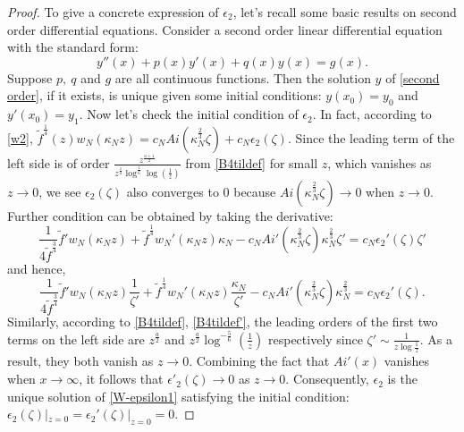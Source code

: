 \documentclass[11pt]{article}
\numberwithin{equation}{section}%
\numberwithin{theorem}{section}
\begin{document}
\begin{proof}
    To give a concrete expression of $\epsilon_2$, let's recall some basic results on second order differential equations. Consider a second order linear differential equation with the standard form:
    \begin{equation}\label{second order}
        y''(x)+p(x)y'(x)+q(x)y(x)=g(x).
    \end{equation}
    Suppose $p,~q$ and $g$ are all continuous functions. Then the solution $y$ of \eqref{second order}, if it exists, is unique given some initial conditions: $y(x_0)=y_0$ and $y'(x_0)=y_1$. Now let's check the initial condition of $\epsilon_2$. In fact, according to \eqref{w2}, $\tilde{f}^\frac{1}{4}(z)w_N(\kappa_Nz)=c_NAi\left(\kappa_N^\frac{2}{3}\zeta\right)+c_N\epsilon_2(\zeta)$. Since the leading term of the left side is of order $\frac{z^\frac{a+1}{2}}{z^\frac{1}{2}\log^\frac{1}{6}\log\left(\frac{1}{z}\right)}$ from \eqref{B4tildef} for small $z$, which vanishes as $z\rightarrow0$, we see $\epsilon_2(\zeta)$ also converges to $0$ because $Ai\left(\kappa_N^\frac{2}{3}\zeta\right)\rightarrow0$ when $z\rightarrow0$. Further condition can be obtained by taking the derivative:
    \begin{equation*}
        \frac{1}{4\tilde{f}^\frac{3}{4}}\tilde{f}'w_N(\kappa_Nz)+\tilde{f}^\frac{1}{4}w_N'(\kappa_Nz)\kappa_N-c_NAi'\left(\kappa_N^\frac{2}{3}\zeta\right)\kappa_N^\frac{2}{3}\zeta'=c_N\epsilon_2'(\zeta)\zeta'
    \end{equation*}
    and hence,
        \begin{equation*}
        \frac{1}{4\tilde{f}^\frac{3}{4}}\tilde{f}'w_N(\kappa_Nz)\frac{1}{\zeta'}+\tilde{f}^\frac{1}{4}w_N'(\kappa_Nz)\frac{\kappa_N}{\zeta'}-c_NAi'\left(\kappa_N^\frac{2}{3}\zeta\right)\kappa_N^\frac{2}{3}=c_N\epsilon_2'(\zeta).
    \end{equation*}
    Similarly, according to \eqref{B4tildef}, \eqref{B4tildef'}, the leading orders of the first two terms on the left side are $z^\frac{a}{2}$ and $z^\frac{a}{2}\log^{-\frac{5}{6}}\left(\frac{1}{z}\right)$ respectively since $\zeta'\sim\frac{1}{z\log\frac{1}{z}}$. As a result, they both vanish as $z\rightarrow0$. Combining the fact that $Ai'(x)$ vanishes when $x\rightarrow\infty$, it follows that $\epsilon'_2(\zeta)\rightarrow0$ as $z\rightarrow0$. Consequently, $\epsilon_2$ is the unique solution of \eqref{W-epsilon1} satisfying the initial condition: $\epsilon_2(\zeta)|_{z=0}=\epsilon_2'(\zeta)|_{z=0}=0$.
    

\end{proof}
\end{document}
